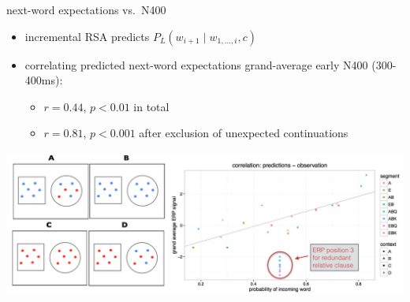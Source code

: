 \documentclass[ignorenonframetext,]{beamer}
\providecommand{\tightlist}{%
\setlength{\itemsep}{0pt}\setlength{\parskip}{0pt}}
\begin{document}
\begin{frame}{next-word expectations vs.~N400}

\begin{itemize}
\tightlist
\item
  incremental RSA predicts \(P_L(w_{i+1} \mid w_{1,\dots,i}, c)\)
\item
  correlating predicted next-word expectations grand-average early N400
  (300-400ms):

  \begin{itemize}
  \tightlist
  \item
    \(r= 0.44\), \(p < 0.01\) in total
  \item
    \(r = 0.81\), \(p < 0.001\) after exclusion of unexpected
    continuations
  \end{itemize}
\end{itemize}

\begin{center}
\includegraphics[width = \textwidth]{pics/combined_plots.png}
\end{center}

\end{frame}
\end{document}
